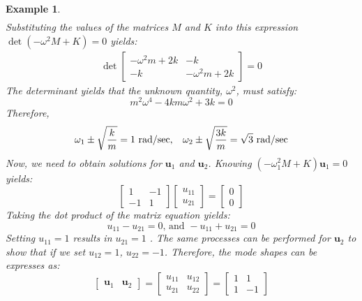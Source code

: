 \documentclass[12pt,letter]{article}
\newtheorem{ex}{Example}
\numberwithin{ex}{section} %
\newenvironment{example}{\begin{mdframed}[middlelinewidth=0.5mm]\begin{ex}\normalfont}{\end{ex}\end{mdframed}}
\numberwithin{re}{section} %
\begin{document}
\begin{example}
\begin{eqnarray}
\end{eqnarray}
Substituting the values of the matrices $M$ and $K$ into this expression $\det(-\omega^2 M  + K) = 0$ yields: 
\begin{eqnarray}
\det\begin{bmatrix} -\omega^2 m + 2k & -k  \\  -k & -\omega^2 m + 2k \end{bmatrix}=0
\end{eqnarray}
The determinant yields that the unknown quantity, $\omega^2$, must satisfy:
\begin{equation}
m^2 \omega^4 - 4km\omega^2 + 3k = 0
\end{equation}
Therefore, 
\begin{equation}
\omega_1 \pm \sqrt{\frac{k}{m}}=1 \text{ rad/sec}, \hspace{2ex} \omega_2 \pm \sqrt{\frac{3k}{m}}=\sqrt{3} \text{ rad/sec}
\end{equation}
Now, we need to obtain solutions for $\mathbf{u}_1$ and $\mathbf{u}_2$. Knowing $(-\omega_1^2 M  + K)\mathbf{u}_1 =0$ yields:
\begin{equation}
	 \begin{bmatrix} 1 & -1 \\    -1  & 1 \end{bmatrix} 
	 \begin{bmatrix} u_{11}\\ u_{21}\end{bmatrix}=\begin{bmatrix} 0\\ 0\end{bmatrix}
\end{equation}
Taking the dot product of the matrix equation yields:
\begin{equation}
	u_{11} - u_{21}=0 \text{, and } - u_{11} + u_{21}=0
\end{equation}
Setting $u_{11} = 1$ results in $u_{21} = 1$ . The same processes can be performed for $\mathbf{u}_2$ to show that if we set $u_{12} = 1$, $u_{22} = -1$. Therefore, the mode shapes can be expresses as:
\begin{equation}
	 \begin{bmatrix} \mathbf{u}_1 & \mathbf{u}_2 \end{bmatrix} = \begin{bmatrix}  u_{11} & u_{12} \\ u_{21} & u_{22} \end{bmatrix} = \begin{bmatrix}  1 & 1 \\ 1 & -1 \end{bmatrix}

\end{equation}
\end{example}
\end{document}
